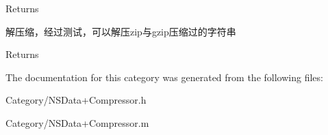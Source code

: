 \begin{DoxyReturn}{Returns}

\end{DoxyReturn}
解压缩，经过测试，可以解压zip与gzip压缩过的字符串

\begin{DoxyReturn}{Returns}

\end{DoxyReturn}


The documentation for this category was generated from the following files\+:\begin{DoxyCompactItemize}
\item 
Category/N\+S\+Data+\+Compressor.\+h\item 
Category/N\+S\+Data+\+Compressor.\+m\end{DoxyCompactItemize}
